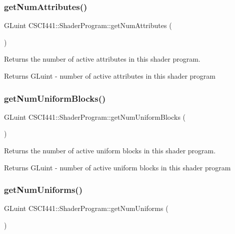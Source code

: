 \subsubsection{\texorpdfstring{get\+Num\+Attributes()}{getNumAttributes()}}
{\footnotesize\ttfamily G\+Luint C\+S\+C\+I441\+::\+Shader\+Program\+::get\+Num\+Attributes (\begin{DoxyParamCaption}{ }\end{DoxyParamCaption})}



Returns the number of active attributes in this shader program. 

\begin{DoxyReturn}{Returns}
G\+Luint -\/ number of active attributes in this shader program 
\end{DoxyReturn}
\mbox{\label{class_c_s_c_i441_1_1_shader_program_a1bc6aedd8b3dc76439717a070aeb4586}} 
\subsubsection{\texorpdfstring{get\+Num\+Uniform\+Blocks()}{getNumUniformBlocks()}}
{\footnotesize\ttfamily G\+Luint C\+S\+C\+I441\+::\+Shader\+Program\+::get\+Num\+Uniform\+Blocks (\begin{DoxyParamCaption}{ }\end{DoxyParamCaption})}



Returns the number of active uniform blocks in this shader program. 

\begin{DoxyReturn}{Returns}
G\+Luint -\/ number of active uniform blocks in this shader program 
\end{DoxyReturn}
\mbox{\label{class_c_s_c_i441_1_1_shader_program_aa47d813096eba4588d0641e247144376}} 
\subsubsection{\texorpdfstring{get\+Num\+Uniforms()}{getNumUniforms()}}
{\footnotesize\ttfamily G\+Luint C\+S\+C\+I441\+::\+Shader\+Program\+::get\+Num\+Uniforms (\begin{DoxyParamCaption}{ }\end{DoxyParamCaption})}



